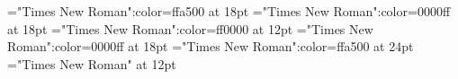 \documentclass[a4paper]{article}
\begin{document}
 
\pagestyle{plain} 
\font\acmain="Times New Roman":color=ffa500 at 18pt
\font\abenmain="Times New Roman":color=0000ff at 18pt
\font\bmain="Times New Roman":color=ff0000 at 12pt
\font\amain="Times New Roman":color=0000ff at 18pt
\font\abcmain="Times New Roman":color=ffa500 at 24pt
\font\main="Times New Roman" at 12pt
\pagestyle{fancy} 






\end{document}
